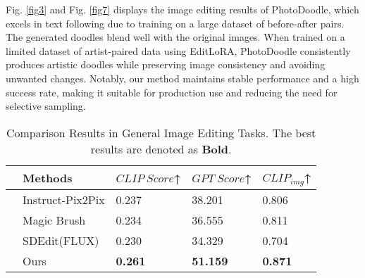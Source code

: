 Fig. \ref{fig3} and Fig. \ref{fig7} displays the image editing results of PhotoDoodle, which excels in text following due to training on a large dataset of before-after pairs. The generated doodles blend well with the original images. When trained on a limited dataset of artist-paired data using EditLoRA, PhotoDoodle consistently produces artistic doodles while preserving image consistency and avoiding unwanted changes. Notably, our method maintains stable performance and a high success rate, making it suitable for production use and reducing the need for selective sampling.




\begin{table}[ht]
\centering
\footnotesize %
\caption{Comparison Results in General Image Editing Tasks. The best results are denoted as \textbf{Bold}.}



\begin{tabular}{lp{2.0cm}p{1.5cm}p{1.5cm}p{1.5cm}}
\toprule
& \textbf{Methods}   & \textbf{$CLIP\ Score$}↑ & \textbf{$GPT\ Score$}↑  & \textbf{$CLIP_{img}$}↑ \\ \midrule
&Instruct-Pix2Pix    & 0.237    &  38.201                          & 0.806                     \\ 
&Magic Brush         & 0.234    & 36.555                           & 0.811                     \\ 
&SDEdit(FLUX)        & 0.230     & 34.329                              & 0.704                     \\ 
& Ours               & \textbf{0.261}    & \textbf{51.159}                           & \textbf{0.871}                     \\ \midrule
\end{tabular}
\label{tab:comparison_universal}
\end{table}


